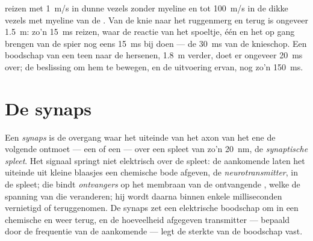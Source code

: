 \begin{example}[Snelheid]\label{ex:g12:stretch-reflex:speed}
 reizen met \qty{1}{m/s} in dunne vezels zonder myeline en
tot \qty{100}{m/s} in de dikke vezels met myeline van de . Van de
knie naar het ruggenmerg en terug is ongeveer \qty{1.5}{m}: zo'n
\qty{15}{ms} reizen, waar de reactie van het spoeltje, één  en het
op gang brengen van de spier nog eens \qty{15}{ms} bij doen --- de
\qty{30}{ms} van de knieschop. Een boodschap van een teen naar de
hersenen, \qty{1.8}{m} verder, doet er ongeveer \qty{20}{ms} over; de
beslissing om hem te bewegen, en de uitvoering ervan, nog zo'n
\qty{150}{ms}.
\end{example}

\section{De synaps}

\begin{definition}\label{def:g12:stretch-reflex:synapse}
Een \emph{synaps} is de overgang waar het uiteinde van het
axon van het ene  de volgende  ontmoet --- een  of een
 --- over een spleet van zo'n \qty{20}{nm}, de \emph{synaptische
spleet}. Het signaal springt niet elektrisch over de spleet: de
aankomende  laten het uiteinde uit kleine blaasjes een
chemische bode afgeven, de
\emph{neurotransmitter}, in de spleet; die bindt
\emph{ontvangers} op het membraan van de ontvangende , welke de
spanning van die  veranderen; hij wordt daarna binnen enkele
milliseconden vernietigd of teruggenomen. De synaps zet een elektrische
boodschap om in een chemische en weer terug, en de hoeveelheid afgegeven
transmitter --- bepaald door de frequentie van de aankomende
 --- legt de sterkte van de boodschap vast.
\end{definition}

